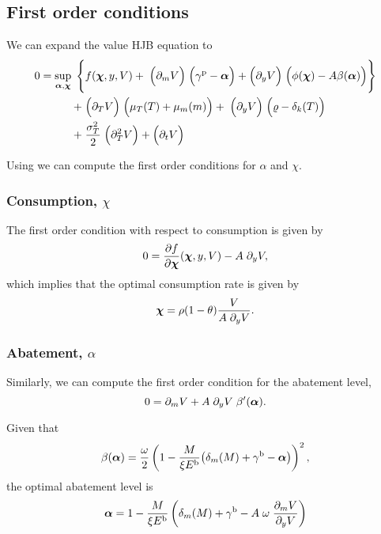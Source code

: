 \documentclass[../../main.tex]{subfiles}
\begin{document}
\subsection{First order conditions}

We can expand the value HJB equation to     
\begin{equation}
    \begin{split}
        0 = \sup_{\bm{\alpha}, \bm{\chi}} \; \Bigg\{ &f(\bm{\chi}, y, V ) + \;
        \Big(\partial_{m} V \Big) \; \Big(\gamma^{\mathrm{p}} - \bm{\alpha} \Big) + \Big(\partial_{y} V \Big) \;  \Big(\phi(\bm{\chi}) - A \beta(\bm{\alpha}) \Big) \Bigg\} \\
        + \; &\Big(\partial_T V \Big) \; \Big(\mu_T(T) + \mu_{m}(m) \Big) + \;
        \Big(\partial_{y} V \Big) \; \Big(\varrho - \delta_k(T) \Big) \\
        + \; &\frac{\sigma_T^2}{2} \; \Big(\partial^2_T V \Big) + \Big(\partial_t V\Big)
    \end{split}
\end{equation}

Using we can compute the first order conditions for $\alpha$ and $\chi$. 


\subsubsection[Consumption]{Consumption, $\chi$}

The first order condition with respect to consumption is given by \begin{equation}
    0 = \frac{\partial f}{\partial \bm{\chi}}(\bm{\chi}, y, V) - A \; \partial_y V,
\end{equation} which implies that the optimal consumption rate is given by \begin{equation}
    \bm{\chi} = \rho (1 - \theta) \frac{V}{A \; \partial_y V}.
\end{equation}

\subsubsection[Abatement]{Abatement, $\alpha$}

Similarly, we can compute the first order condition for the abatement level, \begin{equation}
    0 = \partial_m V + A \; \partial_y V \; \beta^\prime(\bm{\alpha}). 
\end{equation}

Given that \begin{equation}
    \beta(\bm{\alpha}) = \frac{\omega}{2} \left(1 - \frac{M}{\xi  E^{\mathrm{b}}} \big( \delta_m(M) + \gamma^{\mathrm{b}} - \bm{\alpha} \big) \right)^2,  
\end{equation} the optimal abatement level is \begin{equation}
    \bm{\alpha} = 1 - \frac{M}{\xi  E^{\mathrm{b}}} \left( \delta_m(M) + \gamma^{\mathrm{b}} - A \; \omega \; \frac{\partial_m V}{\partial_y V} \right)
\end{equation}
\end{document}
